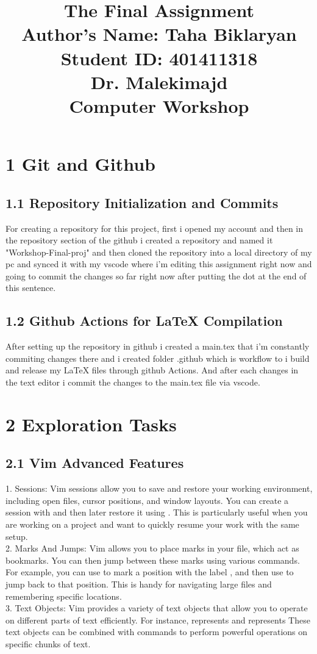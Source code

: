 \documentclass{article}
\title{\Huge The Final Assignment \\[1cm]
\Large Author's Name: Taha Biklaryan \\[0.5cm]
\large Student ID: 401411318 \\[1cm]  
\large Dr. Malekimajd \\[1cm]
\large Computer Workshop}
\date{} %
\begin{document}
\maketitle
\newpage
\section*{\Huge 1 Git and Github}
\subsection*{\Large 1.1 Repository Initialization and Commits}
For creating a repository for this project, first i opened my account and then in the repository section of the github i created a repository and named it "Workshop-Final-proj" and then 
cloned the repository into a local directory of my pc and synced it with my vscode where i'm editing this assignment right now and going to commit the changes so far right now after putting the dot
at the end of this sentence.\\
\subsection*{\Large 1.2 Github Actions for LaTeX Compilation}
After setting up the repository in github i created a main.tex that i'm constantly commiting changes there
and i created folder .github which is workflow to i build and release my LaTeX files through github Actions.
And after each changes in the text editor i commit the changes to the main.tex file via vscode.\\


\section*{\Huge 2 Exploration Tasks}
\subsection*{\Large 2.1 Vim Advanced Features}
1. Sessions:
Vim sessions allow you to save and restore your working environment, including open files, cursor positions, and window layouts. You can create a session with  and then later restore it using . This is particularly useful when you are working on a project and want to quickly resume your work with the same setup.\\
2. Marks And Jumps:
Vim allows you to place marks in your file, which act as bookmarks. You can then jump between these marks using various commands. For example, you can use  to mark a position with the label , and then use  to jump back to that position. This is handy for navigating large files and remembering specific locations.\\
3. Text Objects:
Vim provides a variety of text objects that allow you to operate on different parts of text efficiently. For instance,  represents  and  represents  These text objects can be combined with commands to perform powerful operations on specific chunks of text.\\
\end{document}

